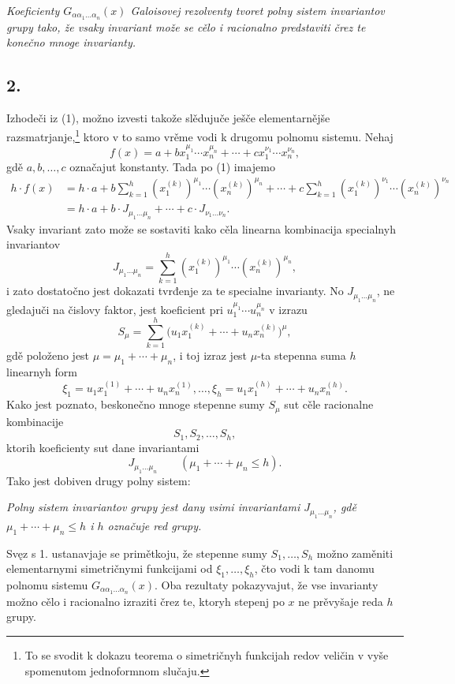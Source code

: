 \documentclass[11pt]{article}
\begin{document}
{\itshape Koeficienty $G_{\alpha\alpha_1\ldots\alpha_n}(x)$ Galoisovej rezolventy tvoret polny sistem invariantov grupy tako, že vsaky invariant može se cělo i racionalno predstaviti črez te konečno mnoge invarianty.}

\subsection*{2.}
Izhodeči iz (1), možno izvesti takože slědujuče ješče elementarnějše razsmatrjanje,\footnote{To se svodit k dokazu teorema o simetričnyh funkcijah redov veličin v vyše spomenutom jednoformnom slučaju.} ktoro v to samo vrěme vodi k drugomu polnomu sistemu. Nehaj
\[
  f(x)=a+b x_1^{\mu_1}\cdots x_n^{\mu_n}
       +\cdots+c x_1^{\nu_1}\cdots x_n^{\nu_n},
\]
gdě $a,b,\ldots,c$ označajut konstanty. Tada po (1) imajemo
\[
\begin{aligned}
 h\cdot f(x)
 &=h\cdot a+b\sum_{k=1}^{h}(x_1^{(k)})^{\mu_1}\cdots(x_n^{(k)})^{\mu_n}
     +\cdots
     +c\sum_{k=1}^{h}(x_1^{(k)})^{\nu_1}\cdots(x_n^{(k)})^{\nu_n} \\
 &=h\cdot a+b\cdot J_{\mu_1\ldots\mu_n}+\cdots+c\cdot J_{\nu_1\ldots\nu_n}.
\end{aligned}
\]
Vsaky invariant zato može se sostaviti kako cěla linearna kombinacija specialnyh invariantov
\[
  J_{\mu_1\ldots\mu_n}
  =\sum_{k=1}^{h}(x_1^{(k)})^{\mu_1}\cdots(x_n^{(k)})^{\mu_n},
\]
i zato dostatočno jest dokazati tvrđenje za te specialne invarianty. No $J_{\mu_1\ldots\mu_n}$, ne gledajuči na čislovy faktor, jest koeficient pri $u_1^{\mu_1}\cdots u_n^{\mu_n}$ v izrazu
\[
  S_\mu=\sum_{k=1}^{h}
  \bigl(u_1x_1^{(k)}+\cdots+u_nx_n^{(k)}\bigr)^{\mu},
\]
gdě položeno jest $\mu=\mu_1+\cdots+\mu_n$, i toj izraz jest $\mu$-ta stepenna suma $h$ linearnyh form
\[
  \xi_1=u_1x_1^{(1)}+\cdots+u_nx_n^{(1)},\ldots,
  \xi_h=u_1x_1^{(h)}+\cdots+u_nx_n^{(h)}.
\]
Kako jest poznato, beskonečno mnoge stepenne sumy $S_\mu$ sut cěle racionalne kombinacije
\[
  S_1,S_2,\ldots,S_h,
\]
ktorih koeficienty sut dane invariantami
\[
  J_{\mu_1\ldots\mu_n}\qquad(\mu_1+\cdots+\mu_n\le h).
\]
Tako jest dobiven drugy polny sistem:

{\itshape Polny sistem invariantov grupy jest dany vsimi invariantami $J_{\mu_1\ldots\mu_n}$, gdě $\mu_1+\cdots+\mu_n\le h$ i $h$ označuje red grupy.}

Svęz s 1. ustanavjaje se primětkoju, že stepenne sumy $S_1,\ldots,S_h$ možno zaměniti elementarnymi simetričnymi funkcijami od $\xi_1,\ldots,\xi_h$, čto vodi k tam danomu polnomu sistemu $G_{\alpha\alpha_1\ldots\alpha_n}(x)$. Oba rezultaty pokazyvajut, že vse invarianty možno cělo i racionalno izraziti črez te, ktoryh stepenj po $x$ ne prěvyšaje reda $h$ grupy.
\end{document}
